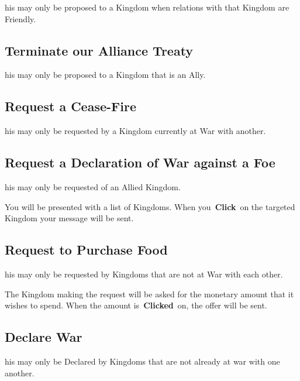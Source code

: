 his may only be proposed to a Kingdom when relations with that Kingdom are Friendly.

\subsection{Terminate our Alliance Treaty}


his may only be proposed to a Kingdom that is an Ally.

\subsection{Request a Cease-Fire}


his may only be requested by a Kingdom currently at War with another.

\subsection{Request a Declaration of War against a Foe}


his may only be requested of an Allied Kingdom.

You will be presented with a list of Kingdoms. When you \textbf{Click} on the targeted Kingdom your message will be sent.

\subsection{Request to Purchase Food}

his may only be requested by Kingdoms that are not at War with each other.

The Kingdom making the request will be asked for the monetary amount that it wishes to spend. When the amount is \textbf{Clicked} on, the offer will be sent.

\subsection{Declare War}


his may only be Declared by Kingdoms that are not already at war with one another.

